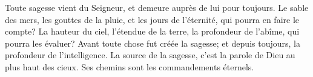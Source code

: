 Toute sagesse vient du Seigneur, et demeure auprès de lui pour toujours.
Le sable des mers, les gouttes de la pluie, et les jours de l’éternité,
	qui pourra en faire le compte?
La hauteur du ciel, l’étendue de la terre, la profondeur de l’abîme,
	qui pourra les évaluer?
Avant toute chose fut créée la sagesse;
	et depuis toujours, la profondeur de l’intelligence.
La source de la sagesse, c’est la parole de Dieu au plus haut des cieux.
	Ses chemins sont les commandements éternels.
